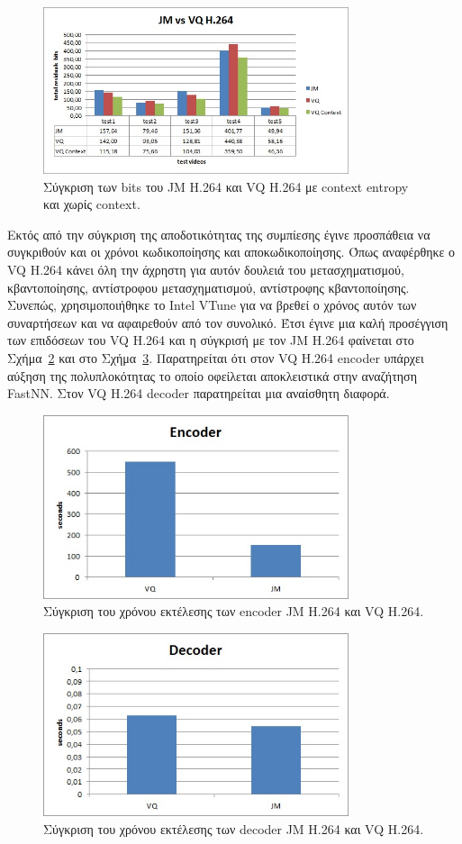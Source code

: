 \begin{figure}[H]
    \centering
    \includegraphics[width=0.8\textwidth]{chapter6/compare1.jpg}
    \caption{Σύγκριση των bits του JM H.264 και VQ H.264 με context entropy και χωρίς context.}
    \label{fig:compare1}
\end{figure}

\indent Εκτός από την σύγκριση της αποδοτικότητας της συμπίεσης έγινε προσπάθεια να συγκριθούν και οι χρόνοι κωδικοποίησης και αποκωδικοποίησης. Όπως αναφέρθηκε ο VQ Η.264 κάνει όλη την άχρηστη για αυτόν δουλειά του μετασχηματισμού, κβαντοποίησης, αντίστροφου μετασχηματισμού, αντίστροφης κβαντοποίησης. Συνεπώς, χρησιμοποιήθηκε το Intel VTune για να βρεθεί ο χρόνος αυτόν των συναρτήσεων και να αφαιρεθούν από τον συνολικό. Έτσι έγινε μια καλή προσέγγιση των επιδόσεων του VQ H.264 και η σύγκρισή με τον JM H.264 φαίνεται στο Σχήμα~\ref{fig:compare2} και στο Σχήμα~\ref{fig:compare3}. Παρατηρείται ότι στον VQ H.264 encoder υπάρχει αύξηση της πολυπλοκότητας το οποίο οφείλεται αποκλειστικά στην αναζήτηση FastNN. Στον VQ H.264 decoder παρατηρείται μια αναίσθητη διαφορά.

 \begin{figure}[H]
    \centering
    \includegraphics[width=0.8\textwidth]{chapter6/compare2.jpg}
    \caption{Σύγκριση του χρόνου εκτέλεσης των encoder JM H.264 και VQ H.264.}
    \label{fig:compare2}
\end{figure}

 \begin{figure}[H]
    \centering
    \includegraphics[width=0.8\textwidth]{chapter6/compare3.jpg}
    \caption{Σύγκριση του χρόνου εκτέλεσης των decoder JM H.264 και VQ H.264.}
    \label{fig:compare3}
\end{figure} 